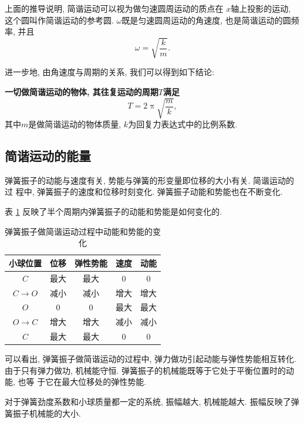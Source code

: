 \documentclass[11pt,a4paper]{ctexbook}
\begin{document}
上面的推导说明, 简谐运动可以视为做匀速圆周运动的质点在
$x$轴上投影的运动, 这个圆叫作简谐运动的参考圆.
$\omega$既是匀速圆周运动的角速度, 也是简谐运动的圆频率, 并且
$$\omega = \sqrt{\frac{k}{m}}.$$

进一步地, 由角速度与周期的关系, 我们可以得到如下结论:

\textbf{一切做简谐运动的物体, 其往复运动的周期$T$满足}
\begin{equation}
    T = 2\uppi\sqrt{\frac{m}{k}},
    \label{简谐运动周期公式}
\end{equation}
其中$m$是做简谐运动的物体质量, $k$为回复力表达式中的比例系数.

\subsection{简谐运动的能量}
\label{简谐运动的能量}

弹簧振子的动能与速度有关, 势能与弹簧的形变量即位移的大小有关. 简谐运动的过
程中, 弹簧振子的速度和位移时刻变化. 弹簧振子动能和势能也在不断变化.

表 \ref{弹簧振子表格} 反映了半个周期内弹簧振子的动能和势能是如何变化的.

\begin{table}[h!]
 \begin{center}
   \caption{弹簧振子做简谐运动过程中动能和势能的变化}
   \label{弹簧振子表格}
   \begin{tabular}{|c|c|c|c|c|}
    \hline
     \textbf{小球位置} & \textbf{位移} & \textbf{弹性势能} & \textbf{速度} & \textbf{动能}\\
     \hline
     $C$ & 最大 & 最大 & 0 & 0 \\
     \hline
     $C\rightarrow O$ & 减小 & 减小 & 增大 & 增大 \\
     \hline
     $O$ & 0 & 0 & 最大 & 最大 \\
     \hline
     $O\rightarrow C$ & 增大 & 增大 & 减小 & 减小 \\
     \hline
     $C$ & 最大 & 最大 & 0 & 0 \\
     \hline
   \end{tabular}
 \end{center}
\end{table}

可以看出, 弹簧振子做简谐运动的过程中, 弹力做功引起动能与弹性势能相互转化.
由于只有弹力做功, 机械能守恒. 弹簧振子的机械能既等于它处于平衡位置时的动能, 也等
于它在最大位移处的弹性势能.

对于弹簧劲度系数和小球质量都一定的系统, 振幅越大, 机械能越大.
振幅反映了弹簧振子机械能的大小.
\end{document}
